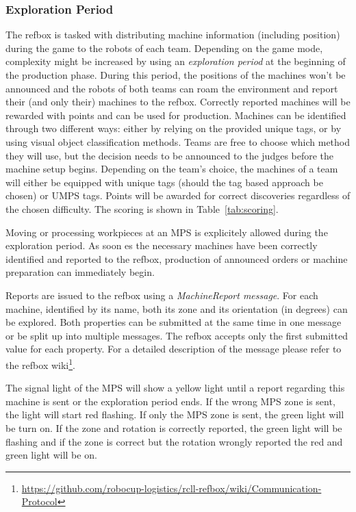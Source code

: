 \documentclass[12pt,twoside]{article}
\newcommand{\reftab}[1]{Table~\ref{#1}}
\begin{document}
\subsubsection{Exploration Period}
\label{sec:exploration-period}

The \ac{refbox} is tasked with distributing machine information
(including position) during the game to the robots of each team.
Depending on the game mode, complexity might be increased by using an
\textit{exploration period} at the beginning of the production phase.
During this period, the positions of the machines won't be announced and the
robots of both teams can roam the environment and report their (and only their)
machines to the \ac{refbox}.
Correctly reported machines will be rewarded with points and can
be used for production. Machines can be identified through two different ways:
either by relying on the provided unique tags, or by using visual object
classification methods.
Teams are free to choose which method they will use, but the
decision needs to be announced to the judges before the machine setup begins.
Depending on the team's choice, the machines of a team will either be equipped
with unique tags (should the tag based approach be chosen) or \ac{UMPS} tags.
Points will be awarded for correct discoveries regardless of the chosen
difficulty.
The scoring is shown in \reftab{tab:scoring}.

Moving or processing workpieces at an \ac{MPS} is explicitely
allowed during the exploration period.
As soon es the necessary machines have been
correctly identified and reported to the \ac{refbox},
production of announced orders or machine preparation can immediately begin.

Reports are issued to the refbox using a \emph{MachineReport message}.
For each machine, identified by its name, both its zone and its orientation
(in degrees) can be explored.
Both properties can be submitted at the same time in one message or be split up
into multiple messages.
The refbox accepts only the first submitted value for each property.
For a detailed description of the message please refer to the \ac{refbox}
wiki\footnote{\url{https://github.com/robocup-logistics/rcll-refbox/wiki/Communication-Protocol}}. %

The signal light of the \ac{MPS} will show a yellow light
until a report regarding this machine is sent or the exploration period ends.
If the wrong \ac{MPS} zone is sent, the light will start red
flashing. If only the \ac{MPS} zone is sent, the green light will be turn on.
If the zone and rotation is correctly reported, the green light will be flashing
and if the zone is correct but the rotation wrongly reported the red and green
light will be on.
\end{document}
